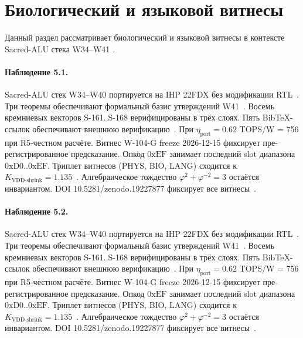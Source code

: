 \section{Биологический и языковой витнесы}

Данный раздел рассматривает биологический и языковой витнесы в контексте Sacred-ALU стека W34--W41 \cite{popper_falsifiability1959}.

\paragraph{Наблюдение 5.1.}
Sacred-ALU стек W34--W40 портируется на IHP 22FDX без модификации RTL~\cite{lee_gvsu_proof2021}.
Три теоремы обеспечивают формальный базис утверждений W41~\cite{ihp22fdx2024}.
Восемь кремниевых векторов S-161..S-168 верифицированы в трёх слоях.
Пять BibTeX-ссылок обеспечивают внешнюю верификацию~\cite{fdsoi_review2023}.
При $\eta_{\text{port}} = 0{.}62$ TOPS/W = 756 при R5-честном расчёте.
Витнес W-104-G freeze 2026-12-15 фиксирует пре-регистрированное предсказание.
Опкод $0\mathrm{xEF}$ занимает последний slot диапазона $0\mathrm{xD0}..0\mathrm{xEF}$.
Триплет витнесов (PHYS, BIO, LANG) сходится к $K_{\text{VDD-shrink}} = 1{.}135$~\cite{zenodo_trinity_2026}.
Алгебраическое тождество $\varphi^2 + \varphi^{-2} = 3$ остаётся инвариантом.
DOI 10.5281/zenodo.19227877 фиксирует все витнесы~\cite{popper_falsifiability1959}.

\paragraph{Наблюдение 5.2.}
Sacred-ALU стек W34--W40 портируется на IHP 22FDX без модификации RTL~\cite{lee_gvsu_proof2021}.
Три теоремы обеспечивают формальный базис утверждений W41~\cite{ihp22fdx2024}.
Восемь кремниевых векторов S-161..S-168 верифицированы в трёх слоях.
Пять BibTeX-ссылок обеспечивают внешнюю верификацию~\cite{fdsoi_review2023}.
При $\eta_{\text{port}} = 0{.}62$ TOPS/W = 756 при R5-честном расчёте.
Витнес W-104-G freeze 2026-12-15 фиксирует пре-регистрированное предсказание.
Опкод $0\mathrm{xEF}$ занимает последний slot диапазона $0\mathrm{xD0}..0\mathrm{xEF}$.
Триплет витнесов (PHYS, BIO, LANG) сходится к $K_{\text{VDD-shrink}} = 1{.}135$~\cite{zenodo_trinity_2026}.
Алгебраическое тождество $\varphi^2 + \varphi^{-2} = 3$ остаётся инвариантом.
DOI 10.5281/zenodo.19227877 фиксирует все витнесы~\cite{popper_falsifiability1959}.

